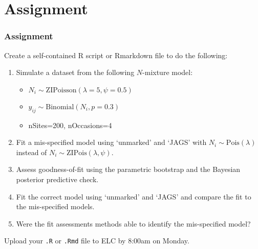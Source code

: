 \documentclass[color=usenames,dvipsnames]{beamer}\usepackage[]{graphicx}\usepackage[]{xcolor}
\begin{document}
\section{Assignment}




\begin{frame}[fragile]
  \frametitle{Assignment}
  \footnotesize
  Create a self-contained R script or Rmarkdown file
  to do the following:
  \vfill
  \begin{enumerate}
    \footnotesize
    \item Simulate a dataset from the following $N$-mixture model:
      \begin{itemize}
        \footnotesize
        \item $N_i \sim \mathrm{ZIPoisson}(\lambda=5, \psi=0.5)$
        \item $y_{ij} \sim \mathrm{Binomial}(N_i, p=0.3)$
        \item nSites=200, nOccasions=4
      \end{itemize}
    \item Fit a \alert{mis-specified model} using `unmarked' and `JAGS' with
      $N_i \sim \mathrm{Pois}(\lambda)$ instead of
      $N_i \sim \mathrm{ZIPois}(\lambda, \psi)$.
    \item Assess goodness-of-fit using the parametric bootstrap and
      the Bayesian posterior predictive check.
    \item Fit the \alert{correct model} using `unmarked' and `JAGS'
      and compare the fit to the mis-specified models.
    \item Were the fit assessments methods able to identify the
      mis-specified model?
  \end{enumerate}
  \vfill
  Upload your {\tt .R} or {\tt .Rmd} file to ELC by 8:00am on Monday. 
\end{frame}
\end{document}

